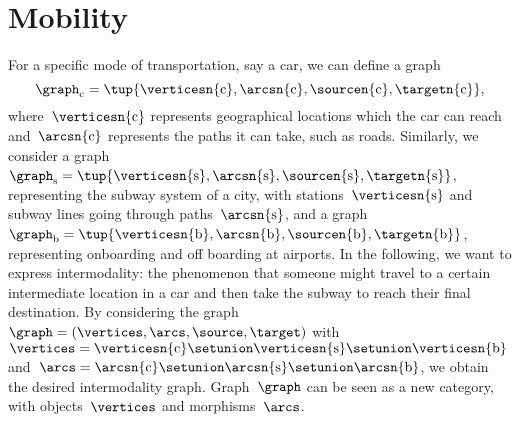 
\section{Mobility}

For a specific mode of transportation, say a car, we can define a graph
\begin{equation}
    \graph_\mathrm{c}=\tup{
        \verticesn{\mathrm{c}},
        \arcsn{\mathrm{c}},
        \sourcen{\mathrm{c}},
        \targetn{\mathrm{c}}
    },
\end{equation}
where~$\verticesn{\mathrm{c}}$ represents geographical locations which the car can reach and~$\arcsn{\mathrm{c}}$ represents the paths it can take, such as roads.
Similarly, we consider a graph~$\graph_\mathrm{s}=\tup{\verticesn{\mathrm{s}},\arcsn{\mathrm{s}},\sourcen{\mathrm{s}},\targetn{\mathrm{s}}}$, representing the subway system of a city, with stations~$\verticesn{\mathrm{s}}$ and subway lines going through paths~$\arcsn{\mathrm{s}}$, and a graph~$\graph_\mathrm{b}=\tup{\verticesn{\mathrm{b}},\arcsn{\mathrm{b}},\sourcen{\mathrm{b}},\targetn{\mathrm{b}}}$, representing onboarding and off boarding at airports.
In the following, we want to express intermodality: the phenomenon that someone might travel to a certain intermediate location in a car and then take the subway to reach their final destination.
By considering the graph~$\graph=(\vertices,\arcs,\source,\target)$ with~$\vertices=\verticesn{\mathrm{c}}\setunion \verticesn{\mathrm{s}}\setunion \verticesn{\mathrm{b}}$ and~$\arcs=\arcsn{\mathrm{c}}\setunion \arcsn{\mathrm{s}}\setunion \arcsn{\mathrm{b}}$, we obtain the desired intermodality graph.
Graph~$\graph$ can be seen as a new category, with objects~$\vertices$ and morphisms~$\arcs$.
